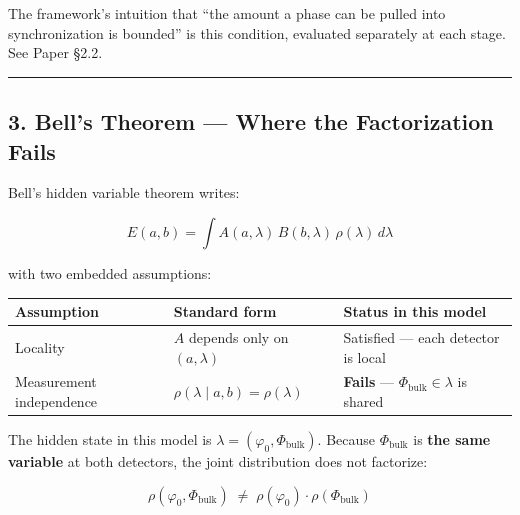\documentclass[
]{article}
\newcounter{none} %
\begin{document}
The framework's intuition that ``the amount a phase can be pulled into
synchronization is bounded'' is this condition, evaluated separately at
each stage. See Paper §2.2.

\begin{center}\rule{0.5\linewidth}{0.5pt}\end{center}

\subsection{3. Bell's Theorem --- Where the Factorization
Fails}\label{bells-theorem-where-the-factorization-fails}

Bell's hidden variable theorem writes:

\[E(a, b) = \int A(a,\lambda)\, B(b,\lambda)\, \rho(\lambda)\, d\lambda\]

with two embedded assumptions:

{\def\LTcaptype{none} %
\begin{longtable}[]{@{}
  >{\raggedright\arraybackslash}p{}
  >{\raggedright\arraybackslash}p{}
  >{\raggedright\arraybackslash}p{}@{}}
\toprule\noalign{}
\begin{minipage}[b]{\linewidth}\raggedright
Assumption
\end{minipage} & \begin{minipage}[b]{\linewidth}\raggedright
Standard form
\end{minipage} & \begin{minipage}[b]{\linewidth}\raggedright
Status in this model
\end{minipage} \\
\midrule\noalign{}
\endhead
\bottomrule\noalign{}
\endlastfoot
Locality & \(A\) depends only on \((a, \lambda)\) & Satisfied --- each
detector is local \\
Measurement independence & \(\rho(\lambda \mid a,b) = \rho(\lambda)\) &
\textbf{Fails} --- \(\Phi_{\text{bulk}} \in \lambda\) is shared \\
\end{longtable}
}

The hidden state in this model is
\(\lambda = (\varphi_0, \Phi_{\text{bulk}})\). Because
\(\Phi_{\text{bulk}}\) is \textbf{the same variable} at both detectors,
the joint distribution does not factorize:

\[\rho(\varphi_0, \Phi_{\text{bulk}}) \;\neq\; \rho(\varphi_0) \cdot \rho(\Phi_{\text{bulk}})\]
\end{document}

